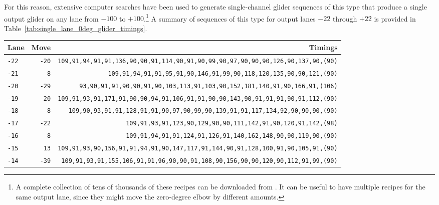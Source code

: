 For this reason, extensive computer searches have been used to generate single-channel glider sequences of this type that produce a single output glider on any lane from $-100$ to $+100$.\footnote{A complete collection of tens of thousands of these recipes can be downloaded from . It can be useful to have multiple recipes for the same output lane, since they might move the zero-degree elbow by different amounts.} A summary of sequences of this type for output lanes $-22$ through $+22$ is provided in Table~\ref{tab:single_lane_0deg_glider_timings}.

\begingroup\renewcommand{\arraystretch}{0.95}
\begin{table}[!phtb]
	\centering
	\begin{tabular}{@{\hskip 0.31cm}L@{\hskip 0.27cm}r@{\hskip 0.27cm}R@{\hskip 0.34cm}}\toprule
		Lane & Move & Timings \\\midrule
		\texttt{-22} & \texttt{-20} & \footnotesize\texttt{109,91,94,91,91,136,90,90,91,114,90,91,90,99,90,97,90,90,90,126,90,137,90,{\color{gray}(90)}} \\
		\texttt{-21} & \texttt{8} & \footnotesize\texttt{109,91,94,91,91,95,91,90,146,91,99,90,118,120,135,90,90,121,{\color{gray}(90)}} \\
		\texttt{-20} & \texttt{-29} & \footnotesize\texttt{93,90,91,91,90,90,91,90,103,113,91,103,90,152,181,140,91,90,166,91,{\color{gray}(106)}} \\
		\texttt{-19} & \texttt{-20} & \footnotesize\texttt{109,91,93,91,171,91,90,90,94,91,106,91,91,90,90,143,90,91,91,91,90,91,112,{\color{gray}(90)}} \\
		\texttt{-18} & \texttt{8} & \footnotesize\texttt{109,90,93,91,91,128,91,91,90,97,90,99,90,139,91,91,117,134,92,90,90,90,{\color{gray}(90)}} \\
		\texttt{-17} & \texttt{-22} & \footnotesize\texttt{109,91,93,91,123,90,129,90,90,111,142,91,90,120,91,142,{\color{gray}(98)}} \\
		\texttt{-16} & \texttt{8} & \footnotesize\texttt{109,91,94,91,91,124,91,126,91,140,162,148,90,90,119,90,{\color{gray}(90)}} \\
		\texttt{-15} & \texttt{13} & \footnotesize\texttt{109,91,93,90,156,91,91,94,91,90,147,117,91,144,90,91,128,100,91,90,105,91,{\color{gray}(90)}} \\
		\texttt{-14} & \texttt{-39} & \footnotesize\texttt{109,91,93,91,155,106,91,91,96,90,90,91,108,90,156,90,90,120,90,112,91,99,{\color{gray}(90)}} \\

\end{tabular}
\end{table}
